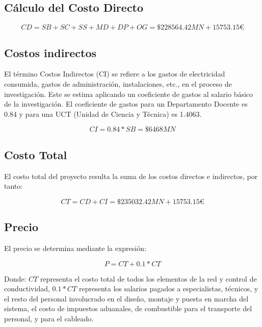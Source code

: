 \subsection{Cálculo del Costo Directo}

\begin{equation}
    CD = SB + SC + SS + MD + DP + OG = \$228564.42 MN + 15753.15€
\end{equation}

\subsection{Costos indirectos}

El término Costos Indirectos (CI) se refiere a los gastos de electricidad consumida, gastos de administración,
instalaciones, etc., en el proceso de investigación. Este se estima aplicando un coeficiente de gastos al
salario básico de la investigación. El coeficiente de gastos para un Departamento Docente es 0.84 y para una
UCT (Unidad de Ciencia y Técnica) es 1.4063.

\begin{equation}
    CI = 0.84 * SB = \$6468 MN
\end{equation}

\subsection{Costo Total}

El costo total del proyecto resulta la suma de los costos directos e indirectos, por tanto:

\begin{equation}
    CT = CD + CI = \$235032.42MN + 15753.15€
\end{equation}

\subsection{Precio}

El precio se determina mediante la expresión:

\begin{equation}
    P = CT + 0.1 * CT
\end{equation}

Donde: $CT$ representa el costo total de todos los elementos de la red y control de conductividad, $0.1*CT$
representa los salarios pagados a especialistas, técnicos, y el resto del personal involucrado en el diseño,
montaje y puesta en marcha del sistema, el costo de impuestos aduanales, de combustible para el transporte del
personal, y para el cableado.

